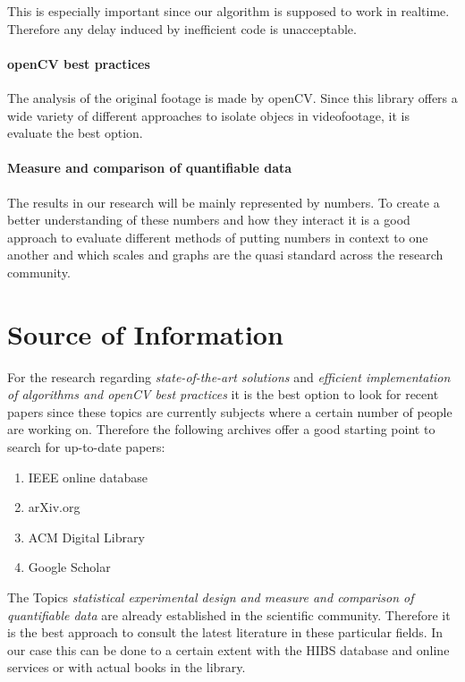 \documentclass[titlepage, a4paper, 11pt]{scrartcl}
\begin{document}
        This is especially important since our algorithm is supposed to work in realtime.
        Therefore any delay induced by inefficient code is unacceptable.

        \paragraph{openCV best practices}

        The analysis of the original footage is made by openCV. Since this library offers a wide variety of different approaches to isolate objecs in videofootage,
        it is evaluate the best option.

        \paragraph{Measure and comparison of quantifiable data}

        The results in our research will be mainly represented by numbers. To create a better understanding of these numbers and how they interact it is a good approach to 
        evaluate different methods of putting numbers in context to one another and which scales and graphs are the quasi standard across the research community.


    \section{Source of Information}

    For the research regarding \textit{state-of-the-art solutions} and \textit{efficient implementation of algorithms and openCV best practices} it is the best option to look for recent papers since these topics are currently
    subjects where a certain number of people are working on. Therefore the following archives offer a good starting point to search for up-to-date papers:

    \begin{enumerate}
        \item IEEE online database
        \item arXiv.org
        \item ACM Digital Library
        \item Google Scholar
    \end{enumerate}

    The Topics \textit{statistical experimental design and measure and comparison of quantifiable data} are already established in the scientific community.
    Therefore it is the best approach to consult the latest literature in these particular fields. In our case this can be done to a certain extent with the HIBS database
    and online services or with actual books in the library.
\end{document}
